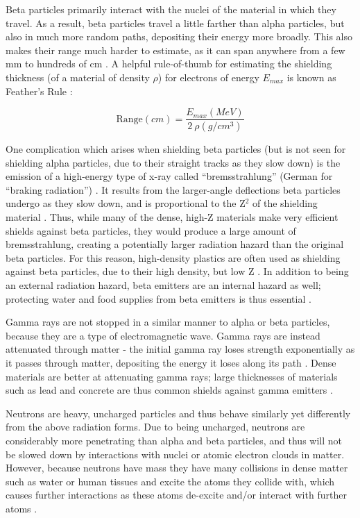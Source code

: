 \documentclass{report}
\begin{document}
Beta particles primarily interact with the nuclei of the material in which they travel. As a result, beta particles travel a little farther than alpha particles, but also in much more random paths, depositing their energy more broadly. This also makes their range much harder to estimate, as it can span anywhere from a few mm to hundreds of cm \cite{krane1987introductory}. A helpful rule-of-thumb for estimating the shielding thickness (of a material of density \(\rho\)) for electrons of energy \(E_{max}\) is known as Feather's Rule \cite{Stabin2007}:

\begin{equation}
 \text{Range} (cm) = \dfrac{E_{max}(MeV)}{2\ \rho (g/cm^3)}
\end{equation}

One complication which arises when shielding beta particles (but is not seen for shielding alpha particles, due to their straight tracks as they slow down) is the emission of a high-energy type of x-ray called \enquote{bremsstrahlung} (German for \enquote{braking radiation}) \cite{Cherry2012}. It results from the larger-angle deflections beta particles undergo as they slow down, and is proportional to the Z\(^2\) of the shielding material \cite{krane1987introductory}. Thus, while many of the dense, high-Z materials make very efficient shields against beta particles, they would produce a large amount of bremsstrahlung, creating a potentially larger radiation hazard than the original beta particles. For this reason, high-density plastics are often used as shielding against beta particles, due to their high density, but low Z \cite{Cember2008}. In addition to being an external radiation hazard, beta emitters are an internal hazard as well; protecting water and food supplies from beta emitters is thus essential \cite{CentersforDiseaseControlandPrevention}. 


Gamma rays are not stopped in a similar manner to alpha or beta particles, because they are a type of electromagnetic wave. Gamma rays are instead attenuated through matter - the initial gamma ray loses strength exponentially as it passes through matter, depositing the energy it loses along its path \cite{krane1987introductory}. Dense materials are better at attenuating gamma rays; large thicknesses of materials such as lead and concrete are thus common shields against gamma emitters \cite{Stabin2007}. 

Neutrons are heavy, uncharged particles and thus behave similarly yet differently from the above radiation forms. Due to being uncharged, neutrons are considerably more penetrating than alpha and beta particles, and thus will not be slowed down by interactions with nuclei or atomic electron clouds in matter. However, because neutrons have mass they have many collisions in dense matter such as water or human tissues and excite the atoms they collide with, which causes further interactions as these atoms de-excite and/or interact with further atoms \cite{krane1987introductory}. 
\end{document}
